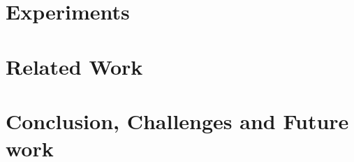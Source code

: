 \documentclass{article}
\newcommand\ignore[1]{}
\newcommand\comment[1]{\marginpar{\parbox{\marginparwidth}{\tiny #1}}}
\renewcommand\comment[1]{#1}
\newcommand{\todo}[1]{{\comment{\color{red}\textsc{TODO:}#1} }}
\begin{document}
\section{Experiments}
\label{sec:experiments}

%  

\section{Related Work}\label{sec:related}



\section{Conclusion, Challenges and Future work}\label{sec:conclusion}


\ignore{
\newpage
{\color{red}This should be page (at most) 7. Limit is 6 real pages, 1 page of references. Proofs go in appendix. If references are too long, I will shorten them. That is not an issue}
\newpage
}
\clearpage
{\small

 
}
% 
\end{document}
